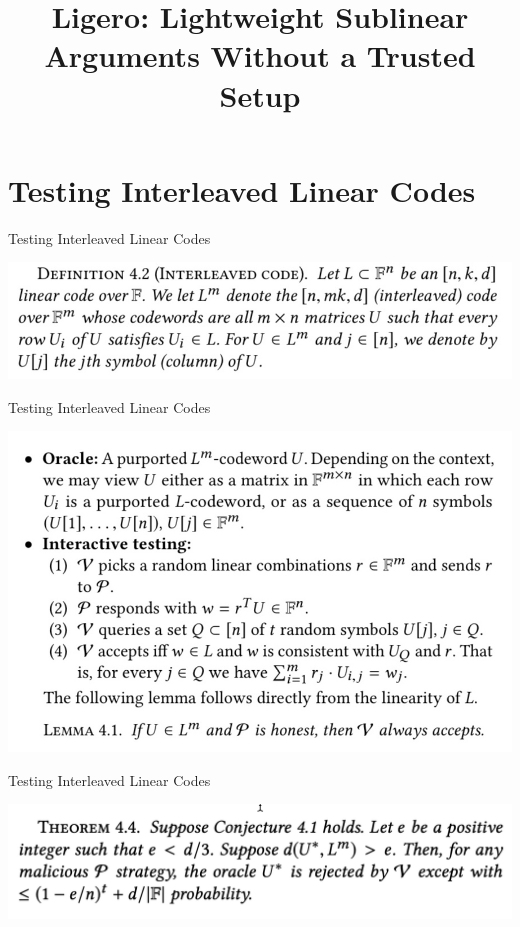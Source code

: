 \documentclass{beamer}
\title{
	Ligero: Lightweight Sublinear Arguments
	Without a Trusted Setup
}
\date{}
\begin{document}
\section{Testing Interleaved Linear Codes}

\begin{frame}{Testing Interleaved Linear Codes}
	\begin{minipage}{0.42\linewidth}
		\includegraphics[scale=0.34]{2.jpg}
	\end{minipage}
\end{frame}

\begin{frame}{Testing Interleaved Linear Codes}
	\begin{minipage}{0.42\linewidth}
		\includegraphics[scale=0.30]{1.jpg}
	\end{minipage}
\end{frame}

\begin{frame}{Testing Interleaved Linear Codes}
	\begin{minipage}{0.42\linewidth}
		\includegraphics[scale=0.42]{3.png}
	\end{minipage}
\end{frame}
\end{document}
